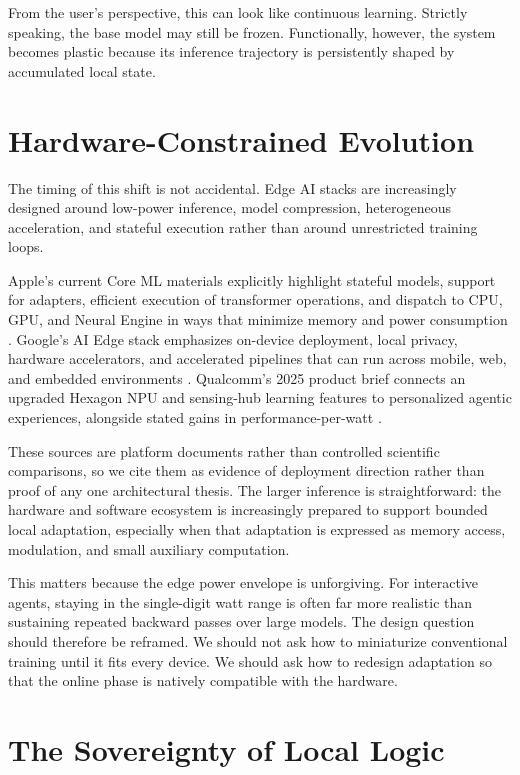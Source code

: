 \documentclass[11pt,a4paper]{article}
\begin{document}
From the user's perspective, this can look like continuous learning. Strictly speaking, the base model may still be frozen. Functionally, however, the system becomes plastic because its inference trajectory is persistently shaped by accumulated local state.

\section{Hardware-Constrained Evolution}

The timing of this shift is not accidental. Edge AI stacks are increasingly designed around low-power inference, model compression, heterogeneous acceleration, and stateful execution rather than around unrestricted training loops.

Apple's current Core ML materials explicitly highlight stateful models, support for adapters, efficient execution of transformer operations, and dispatch to CPU, GPU, and Neural Engine in ways that minimize memory and power consumption \cite{apple_coreml}. Google's AI Edge stack emphasizes on-device deployment, local privacy, hardware accelerators, and accelerated pipelines that can run across mobile, web, and embedded environments \cite{google_edge}. Qualcomm's 2025 product brief connects an upgraded Hexagon NPU and sensing-hub learning features to personalized agentic experiences, alongside stated gains in performance-per-watt \cite{qualcomm_2025}.

These sources are platform documents rather than controlled scientific comparisons, so we cite them as evidence of deployment direction rather than proof of any one architectural thesis. The larger inference is straightforward: the hardware and software ecosystem is increasingly prepared to support bounded local adaptation, especially when that adaptation is expressed as memory access, modulation, and small auxiliary computation.

This matters because the edge power envelope is unforgiving. For interactive agents, staying in the single-digit watt range is often far more realistic than sustaining repeated backward passes over large models. The design question should therefore be reframed. We should not ask how to miniaturize conventional training until it fits every device. We should ask how to redesign adaptation so that the online phase is natively compatible with the hardware.

\section{The Sovereignty of Local Logic}
\end{document}
